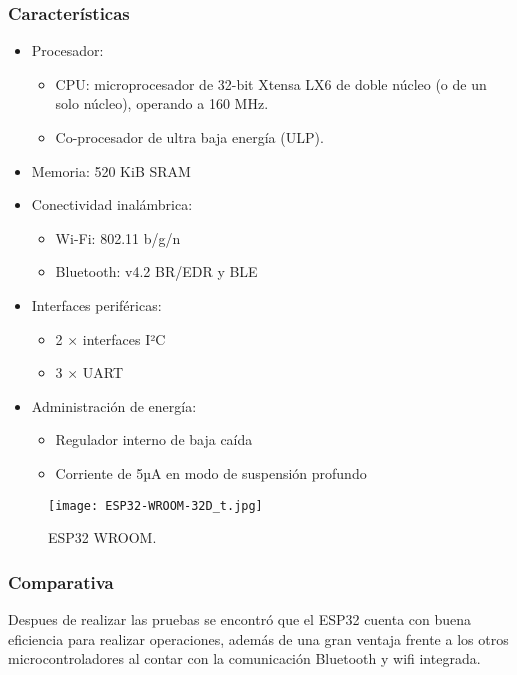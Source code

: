 \subsubsection{Características}
\begin{itemize}
    \item Procesador:
          \begin{itemize}
              \item CPU: microprocesador de 32-bit Xtensa LX6 de doble núcleo (o de un solo núcleo), operando a 160 MHz.
              \item Co-procesador de ultra baja energía (ULP).
          \end{itemize}
    \item Memoria: 520 KiB SRAM
    \item Conectividad inalámbrica:
          \begin{itemize}
              \item Wi-Fi: 802.11 b/g/n
              \item Bluetooth: v4.2 BR/EDR y BLE
          \end{itemize}
    \item Interfaces periféricas:
          \begin{itemize}
              \item 2 × interfaces I²C
              \item 3 × UART
          \end{itemize}
    \item Administración de energía:
          \begin{itemize}
              \item Regulador interno de baja caída
              \item Corriente de 5µA en modo de suspensión profundo
          \end{itemize}
\end{itemize}

\begin{figure}[htp!]
    \centering
    \texttt{[image: ESP32-WROOM-32D\_t.jpg]}
    \caption{ESP32 WROOM.}
    \label{fig: esp32}
\end{figure}
\FloatBarrier

\subsubsection{Comparativa}
Despues de realizar las pruebas se encontró que el ESP32 cuenta con buena eficiencia para realizar operaciones, además de una gran ventaja frente a los otros microcontroladores al contar con la comunicación Bluetooth y wifi integrada.

